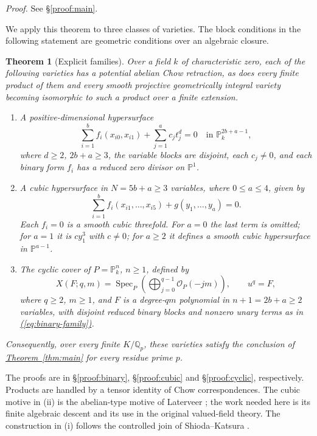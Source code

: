 \documentclass[11pt,a4paper]{article}
\newtheorem{theorem}{Theorem}[section]
\theoremstyle{definition}
\theoremstyle{remark}\newtheorem{remark}[theorem]{Remark}
\numberwithin{equation}{section}
\newcommand{\Q}{\mathbb Q}\newcommand{\R}{\mathbb R}\newcommand{\C}{\mathbb C}
\newcommand{\PP}{\mathbb P}\newcommand{\LL}{\mathbb L}
\newcommand{\Spec}{\operatorname{Spec}}\newcommand{\Bl}{\operatorname{Bl}}
\newcommand{\subref}[1]{\hyperref[#1]{\textcolor{sectionlink}{\S\ref*{#1}}}}
\newcommand{\thmref}[1]{\hyperref[#1]{\textcolor{resultlink}{Theorem~\ref*{#1}}}}
\renewcommand{\eqref}[1]{\hyperref[#1]{\textcolor{equationlink}{(\ref*{#1})}}}
\newcommand{\proofloc}[1]{\emph{Proof.} See \subref{#1}.}
\begin{document}
\proofloc{proof:main}

We apply this theorem to three classes of varieties. The block conditions in
the following statement are geometric conditions over an algebraic closure.

\begin{theorem}[Explicit families]\label{thm:families}
Over a field $k$ of characteristic zero, each of the following varieties
has a potential abelian Chow retraction, as does every finite product of
them and every smooth projective geometrically integral variety becoming
isomorphic to such a product over a finite extension.
\begin{enumerate}[label=\textup{(\roman*)}]
\item A positive-dimensional hypersurface
\begin{equation}\label{eq:binary-family}
 \sum_{i=1}^{b}f_i(x_{i0},x_{i1})+\sum_{j=1}^{a}c_jt_j^d=0
 \quad\text{in }\PP^{2b+a-1}_k,
\end{equation}
where $d\ge2$, $2b+a\ge3$, the variable blocks are disjoint, each
$c_j\ne0$, and each binary form $f_i$ has a reduced zero divisor on $\PP^1$.
\item A cubic hypersurface in $N=5b+a\ge3$ variables, where
$0\le a\le4$, given by
\begin{equation}\label{eq:cubic-family}
       \sum_{i=1}^{b}f_i(x_{i1},\ldots,x_{i5})+g(y_1,\ldots,y_a)=0.
\end{equation}
Each $f_i=0$ is a smooth cubic threefold. For $a=0$ the last term is
omitted; for $a=1$ it is $cy_1^3$ with $c\ne0$; for $a\ge2$ it defines a smooth
cubic hypersurface in $\PP^{a-1}$.
\item The cyclic cover of $P=\PP^n_k$, $n\ge1$, defined by
\begin{equation}\label{eq:cyclic-family}
 X(F;q,m)=\Spec_P\left(\bigoplus_{j=0}^{q-1}\mathcal O_P(-jm)\right),
 \qquad u^q=F,
\end{equation}
where $q\ge2$, $m\ge1$, and $F$ is a degree-$qm$ polynomial in
$n+1=2b+a\ge2$ variables, with disjoint reduced binary blocks and
nonzero unary terms as in \eqref{eq:binary-family}.
\end{enumerate}
Consequently, over every finite $K/\Q_p$, these varieties satisfy the
conclusion of \thmref{thm:main} for every residue prime $p$.
\end{theorem}

The proofs are in \subref{proof:binary}, \subref{proof:cubic} and
\subref{proof:cyclic}, respectively. Products are handled by a tensor
identity of Chow correspondences. The cubic motive in (ii) is the
abelian-type motive of Laterveer \cite[Theorem 5]{Laterveer}; the work
needed here is its finite algebraic descent and its use in the original
valued-field theory. The construction in (i) follows the controlled join
of Shioda--Katsura \cite[Remark 1.10]{SK}.
\end{document}
